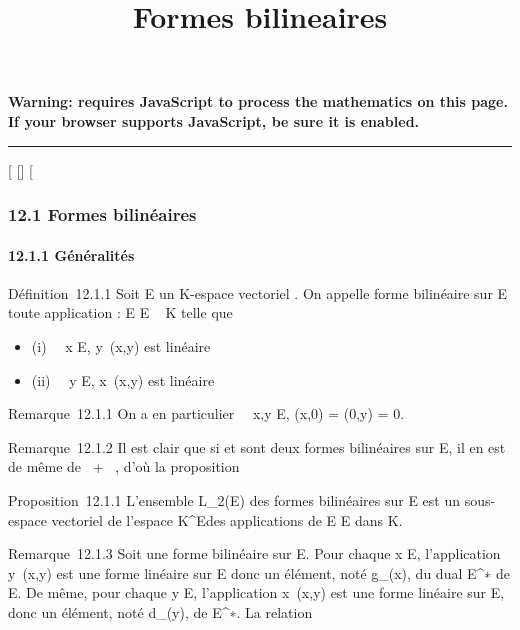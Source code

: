 \documentclass[]{article}
\title{Formes bilineaires}
\author{}
\date{}
\begin{document}
\maketitle

\textbf{Warning: 
requires JavaScript to process the mathematics on this page.\\ If your
browser supports JavaScript, be sure it is enabled.}

\begin{center}\rule{3in}{0.4pt}\end{center}

{[}
{[}{]}
{[}

\subsubsection{12.1 Formes bilinéaires}

\paragraph{12.1.1 Généralités}

Définition~12.1.1 Soit E un K-espace vectoriel . On appelle forme
bilinéaire sur E toute application \phi : E \times E \rightarrow~ K telle que

\begin{itemize}
\itemsep1pt\parskip0pt
\item
  (i) \forall~~x \in E,
  y\mapsto~\phi(x,y) est linéaire
\item
  (ii) \forall~~y \in E,
  x\mapsto~\phi(x,y) est linéaire
\end{itemize}

Remarque~12.1.1 On a en particulier \forall~~x,y \in E,
\phi(x,0) = \phi(0,y) = 0.

Remarque~12.1.2 Il est clair que si \phi et \psi sont deux formes bilinéaires
sur E, il en est de même de \alpha~\phi + \beta~\psi, d'où la proposition

Proposition~12.1.1 L'ensemble L\_2(E) des formes bilinéaires sur
E est un sous-espace vectoriel de l'espace K^E\timesE des
applications de E \times E dans K.

Remarque~12.1.3 Soit \phi une forme bilinéaire sur E. Pour chaque x \in E,
l'application y\mapsto~\phi(x,y) est une forme linéaire
sur E donc un élément, noté g\_\phi(x), du dual E^∗ de
E. De même, pour chaque y \in E, l'application
x\mapsto~\phi(x,y) est une forme linéaire sur E, donc
un élément, noté d\_\phi(y), de E^∗. La relation
\end{document}
